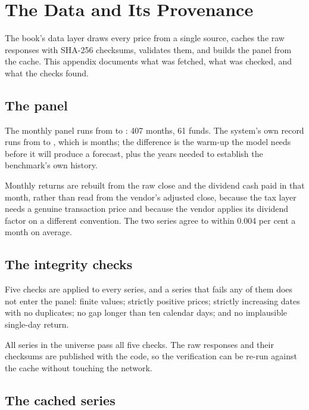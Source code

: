 \chapter{The Data and Its Provenance}
\label{app:data}

\thispagestyle{plain}

The book's data layer draws every price from a single source, caches the
raw responses with SHA-256 checksums, validates them, and builds the
panel from the cache. This appendix documents what was fetched, what was
checked, and what the checks found.

\section{The panel}

The monthly panel runs from \numPanelStart{} to \numPanelEnd{}: 407
months, 61 funds. The system's own record runs from \numRecordStart{} to
\numRecordEnd{}, which is \numRecordMonths{} months; the difference is the
warm-up the model needs before it will produce a forecast, plus the years
needed to establish the benchmark's own history.

Monthly returns are rebuilt from the raw close and the dividend cash paid
in that month, rather than read from the vendor's adjusted close, because
the tax layer needs a genuine transaction price and because the vendor
applies its dividend factor on a different convention. The two series
agree to within 0.004 per cent a month on average.

\section{The integrity checks}

Five checks are applied to every series, and a series that fails any of
them does not enter the panel: finite values; strictly positive prices;
strictly increasing dates with no duplicates; no gap longer than ten
calendar days; and no implausible single-day return.

All \numNFunds{} series in the universe pass all five checks. The raw
responses and their checksums are published with the code, so the
verification can be re-run against the cache without touching the
network.

\section{The cached series}

